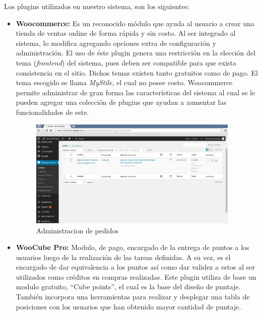 Los plugins utilizados en nuestro sistema, son los siguientes:

\begin{itemize}

    \item {\bf Woocommerce:}
        Es un reconocido módulo que ayuda al usuario a crear una tienda de
        ventas online de forma rápida y sin costo.
        Al ser integrado al sistema, lo modifica agregando opciones
        extra de configuración y administración.
        El uso de éste plugin genera una restricción en la elección
        del tema (\emph{frontend}) del sistema, pues deben ser compatible
        para que exista consistencia en el sitio.
        Dichos temas existen tanto gratuitos como de pago.
        El tema escogido se llama \emph{MyStile}, el cual no posee costo.
        Woocommerce permite administrar de gran forma las características del
        sistema al cual se le pueden agregar una colección de plugins que ayudan a
        aumentar las funcionalidades de este.


\begin{figure}[!htb]
  \centering
  \includegraphics[width=0.95\textwidth]{images/pedidos.png}
  \caption[administracion]{Administracion de pedidos}
  \label{fig:Players}
\end{figure}


    \item {\bf WooCube Pro:}
        Modulo, de pago, encargado de la entrega de puntos a los usuarios luego de
        la realización de las tareas definidas.
        A su vez, es el encargado de dar equivalencia a los puntos así como dar
        validez a estos al ser utilizados como créditos en compras realizadas.
        Este plugin utiliza de base un modulo gratuito, ``Cube points'',
        el cual es la base del diseño de puntaje.
        También incorpora una herramientas para realizar y desplegar una tabla
        de posiciones con los usuarios que han obtenido mayor cantidad de puntaje.


\end{itemize}
